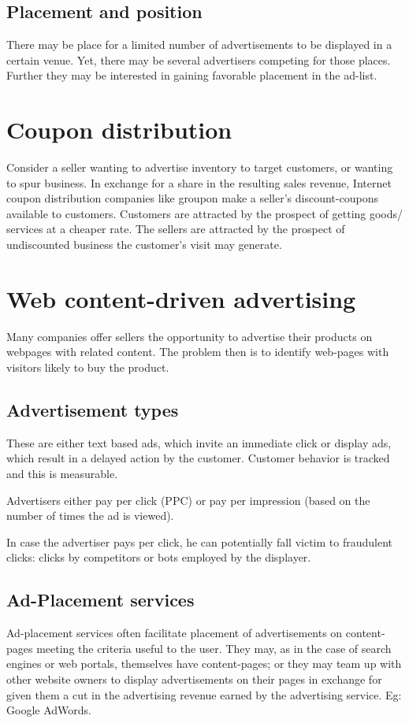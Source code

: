 \documentclass[oneside, article]{memoir}
\begin{document}
\subsection{Placement and position}
There may be place for a limited number of advertisements to be displayed in a certain venue. Yet, there may be several advertisers competing for those places. Further they may be interested in gaining favorable placement in the ad-list.

\section{Coupon distribution}
Consider a seller wanting to advertise inventory to target customers, or wanting to spur business. In exchange for a share in the resulting sales revenue, Internet coupon distribution companies like groupon make a seller's discount-coupons available to customers. Customers are attracted by the prospect of getting goods/ services at a cheaper rate. The sellers are attracted by the prospect of undiscounted business the customer's visit may generate.

\section{Web content-driven advertising}
Many companies offer sellers the opportunity to advertise their products on webpages with related content. The problem then is to identify web-pages with visitors likely to buy the product. 

\subsection{Advertisement types}
These are either text based ads, which invite an immediate click or display ads, which result in a delayed action by the customer. Customer behavior is tracked and this is measurable.

Advertisers either pay per click (PPC) or pay per impression (based on the number of times the ad is viewed).

In case the advertiser pays per click, he can potentially fall victim to fraudulent clicks: clicks by competitors or bots employed by the displayer.

\subsection{Ad-Placement services}
Ad-placement services often facilitate placement of advertisements on content-pages meeting the criteria useful to the user. They may, as in the case of search engines or web portals, themselves have content-pages; or they may team up with other website owners to display advertisements on their pages in exchange for given them a cut in the advertising revenue earned by the advertising service. Eg: Google AdWords.
\end{document}

